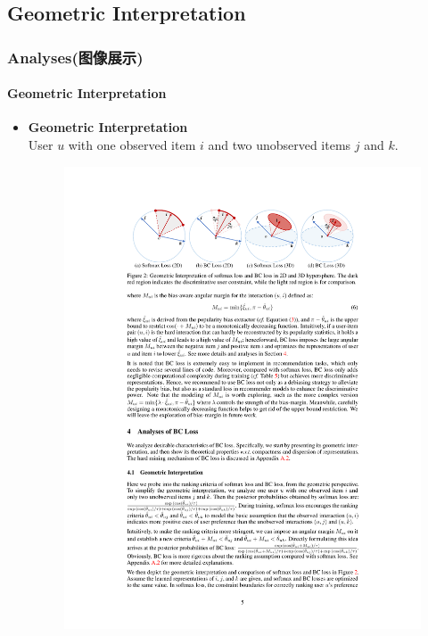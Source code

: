 \documentclass[aspectratio=169]{beamer}%
\begin{document}
{    \subsection{Geometric Interpretation}
        \begin{frame}
            \frametitle{Analyses(图像展示)}
            \framesubtitle{Geometric Interpretation}
            \begin{itemize}
            \item
                \textbf{Geometric Interpretation}\\
                    User $u$ with one observed item $i$ and two unobserved items $j$ and $k$.\\
                    \begin{figure}
                        {\includegraphics[scale=0.92]{figs/fig.pdf}}
                    \end{figure}
            \end{itemize}
        \end{frame}

}
\end{document}
